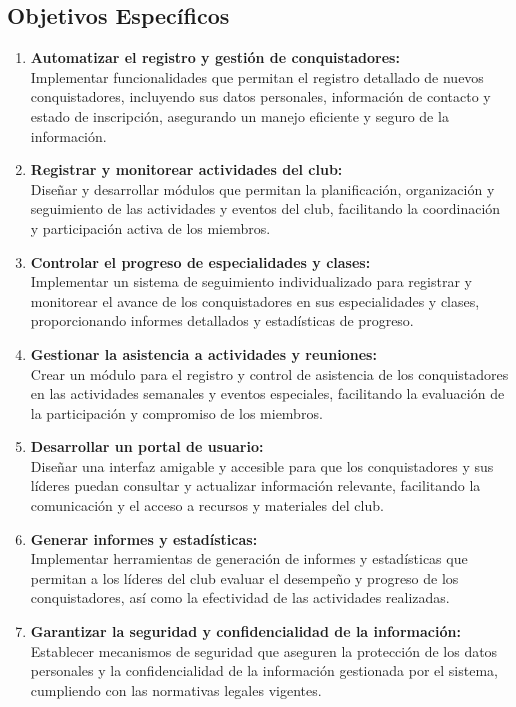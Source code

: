 \documentclass[stu, 12pt, letterpaper, donotrepeattitle, floatsintext, natbib]{apa7}
\begin{document}
\subsection{Objetivos Espec\'ificos}
\begin{enumerate}
    \item\textbf{Automatizar el registro y gesti\'on de conquistadores:}\\Implementar funcionalidades que permitan el registro detallado de nuevos conquistadores, incluyendo sus datos personales, informaci\'on de contacto y estado de inscripci\'on, asegurando un manejo eficiente y seguro de la informaci\'on.
    \item\textbf{Registrar y monitorear actividades del club:}\\Dise\~{n}ar y desarrollar m\'odulos que permitan la planificaci\'on, organizaci\'on y seguimiento de las actividades y eventos del club, facilitando la coordinaci\'on y participaci\'on activa de los miembros.
    \item\textbf{Controlar el progreso de especialidades y clases:}\\Implementar un sistema de seguimiento individualizado para registrar y monitorear el avance de los conquistadores en sus especialidades y clases, proporcionando informes detallados y estad\'isticas de progreso.
    \item\textbf{Gestionar la asistencia a actividades y reuniones:}\\Crear un m\'odulo para el registro y control de asistencia de los conquistadores en las actividades semanales y eventos especiales, facilitando la evaluaci\'on de la participaci\'on y compromiso de los miembros.
    \item\textbf{Desarrollar un portal de usuario:}\\Dise\~{n}ar una interfaz amigable y accesible para que los conquistadores y sus l\'ideres puedan consultar y actualizar informaci\'on relevante, facilitando la comunicaci\'on y el acceso a recursos y materiales del club.
    \item\textbf{Generar informes y estad\'isticas:}\\Implementar herramientas de generaci\'on de informes y estad\'isticas que permitan a los l\'ideres del club evaluar el desempe\~{n}o y progreso de los conquistadores, as\'i como la efectividad de las actividades realizadas.
    \item\textbf{Garantizar la seguridad y confidencialidad de la informaci\'on:}\\Establecer mecanismos de seguridad que aseguren la protecci\'on de los datos personales y la confidencialidad de la informaci\'on gestionada por el sistema, cumpliendo con las normativas legales vigentes.
\end{enumerate}
\end{document}
